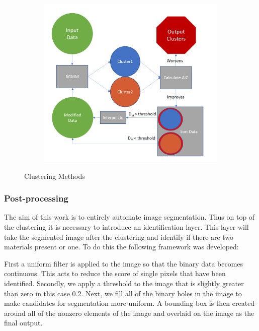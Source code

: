 \documentclass[a4paper,11pt]{article}
\begin{document}
\begin{figure}[htbp]
\begin{subfigure}[b]{0.32\textwidth}
    \end{subfigure}
    \begin{subfigure}[b]{0.32\textwidth}
        \includegraphics[width=\textwidth]{figures/algo_flow.png}
    \end{subfigure}
    \caption{Clustering Methods}
    \label{iterative_method}
\end{figure}

\subsubsection{Post-processing}

The aim of this work is to entirely automate image segmentation. Thus on top of the clustering it is necessary to introduce an identification layer. This layer will take the segmented image after the clustering and identify if there are two materials present or one. To do this the following framework was developed:

First a uniform filter is applied to the image so that the binary data becomes continuous. This acts to reduce the score of single pixels that have been identified. Secondly, we apply a threshold to the image that is slightly greater than zero in this case 0.2. Next, we fill all of the binary holes in the image to make candidates for segmentation more uniform. A bounding box is then created around all of the nonzero elements of the image and overlaid on the image as the final output.
\end{document}
